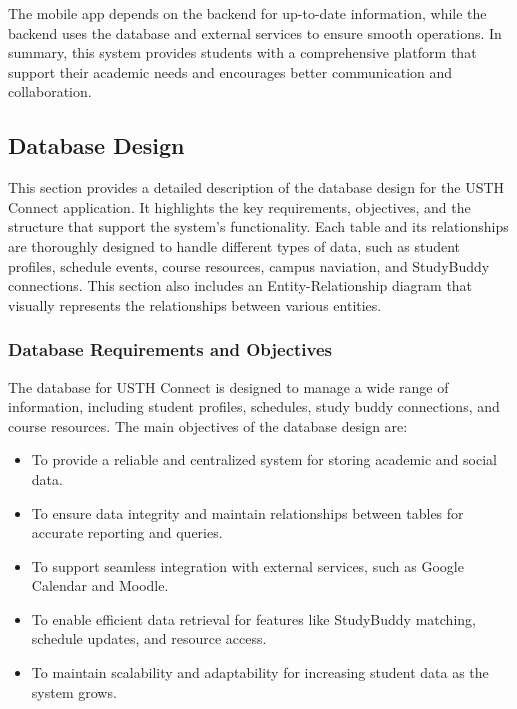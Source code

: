\documentclass[12pt]{article}
\begin{document}
The mobile app depends on the backend for up-to-date information, while the backend uses the database and external services to ensure smooth operations.
In summary, this system provides students with a comprehensive platform that support their academic needs and encourages better communication and collaboration.

\pagebreak
\subsection{Database Design}
This section provides a detailed description of the database design for the USTH Connect application.
It highlights the key requirements, objectives, and the structure that support the system's functionality.
Each table and its relationships are thoroughly designed to handle different types of data, such as student profiles, schedule events, course resources, campus naviation, and StudyBuddy connections.
This section also includes an Entity-Relationship diagram that visually represents the relationships between various entities.

\subsubsection{Database Requirements and Objectives}  
The database for USTH Connect is designed to manage a wide range of information, including student profiles, schedules, study buddy connections, and course resources. The main objectives of the database design are:  
\begin{itemize}  
    \item To provide a reliable and centralized system for storing academic and social data.  
    \item To ensure data integrity and maintain relationships between tables for accurate reporting and queries.  
    \item To support seamless integration with external services, such as Google Calendar and Moodle.  
    \item To enable efficient data retrieval for features like StudyBuddy matching, schedule updates, and resource access.  
    \item To maintain scalability and adaptability for increasing student data as the system grows.  
\end{itemize} 
\end{document}
